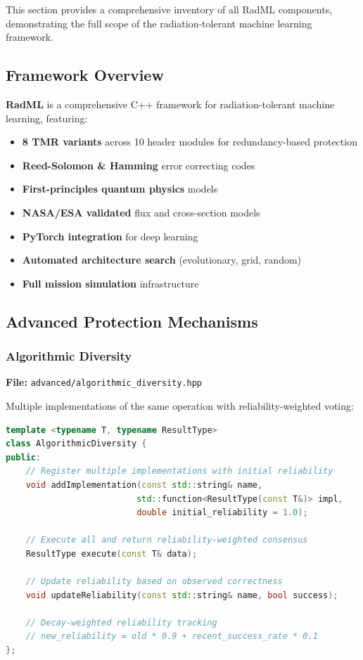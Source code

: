 \documentclass[11pt,a4paper]{article}
\begin{document}
This section provides a comprehensive inventory of all RadML components, demonstrating the full scope of the radiation-tolerant machine learning framework.

\subsection{Framework Overview}

\begin{tcolorbox}[colback=blue!5!white,colframe=blue!75!black,title=RadML Architecture]
\textbf{RadML} is a comprehensive C++ framework for radiation-tolerant machine learning, featuring:
\begin{itemize}
    \item \textbf{8 TMR variants} across 10 header modules for redundancy-based protection
    \item \textbf{Reed-Solomon \& Hamming} error correcting codes
    \item \textbf{First-principles quantum physics} models
    \item \textbf{NASA/ESA validated} flux and cross-section models
    \item \textbf{PyTorch integration} for deep learning
    \item \textbf{Automated architecture search} (evolutionary, grid, random)
    \item \textbf{Full mission simulation} infrastructure
\end{itemize}
\end{tcolorbox}

\subsection{Advanced Protection Mechanisms}

\subsubsection{Algorithmic Diversity}

\textbf{File:} \texttt{advanced/algorithmic\_diversity.hpp}

Multiple implementations of the same operation with reliability-weighted voting:

\begin{lstlisting}[language=C++, basicstyle=\footnotesize\ttfamily]
template <typename T, typename ResultType>
class AlgorithmicDiversity {
public:
    // Register multiple implementations with initial reliability
    void addImplementation(const std::string& name,
                          std::function<ResultType(const T&)> impl,
                          double initial_reliability = 1.0);

    // Execute all and return reliability-weighted consensus
    ResultType execute(const T& data);

    // Update reliability based on observed correctness
    void updateReliability(const std::string& name, bool success);

    // Decay-weighted reliability tracking
    // new_reliability = old * 0.9 + recent_success_rate * 0.1
};
\end{lstlisting}
\end{document}
